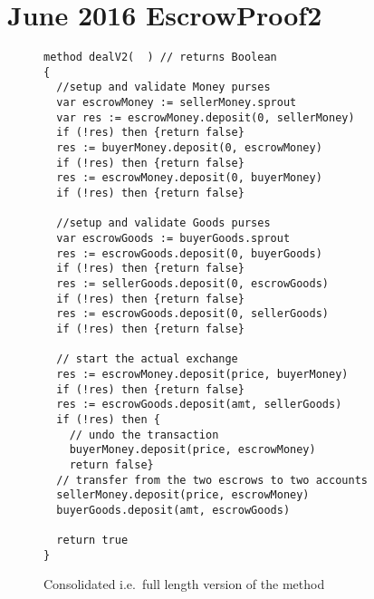 \onecolumn
\section{June 2016 EscrowProof2}


\begin{figure*}[htb]
\begin{lstlisting}
method dealV2(  ) // returns Boolean
{
  //setup and validate Money purses
  var escrowMoney := sellerMoney.sprout
  var res := escrowMoney.deposit(0, sellerMoney)
  if (!res) then {return false}
  res := buyerMoney.deposit(0, escrowMoney)
  if (!res) then {return false}
  res := escrowMoney.deposit(0, buyerMoney)
  if (!res) then {return false}

  //setup and validate Goods purses
  var escrowGoods := buyerGoods.sprout
  res := escrowGoods.deposit(0, buyerGoods)
  if (!res) then {return false}
  res := sellerGoods.deposit(0, escrowGoods)
  if (!res) then {return false}
  res := escrowGoods.deposit(0, sellerGoods)
  if (!res) then {return false}

  // start the actual exchange
  res := escrowMoney.deposit(price, buyerMoney)
  if (!res) then {return false}
  res := escrowGoods.deposit(amt, sellerGoods)
  if (!res) then {
    // undo the transaction
    buyerMoney.deposit(price, escrowMoney)
    return false}
  // transfer from the two escrows to two accounts
  sellerMoney.deposit(price, escrowMoney)
  buyerGoods.deposit(amt, escrowGoods)

  return true
}
\end{lstlisting}
\caption{Consolidated i.e.\ full length version of the  method}
\label{fig:DealV2Consolidated}
\end{figure*}


